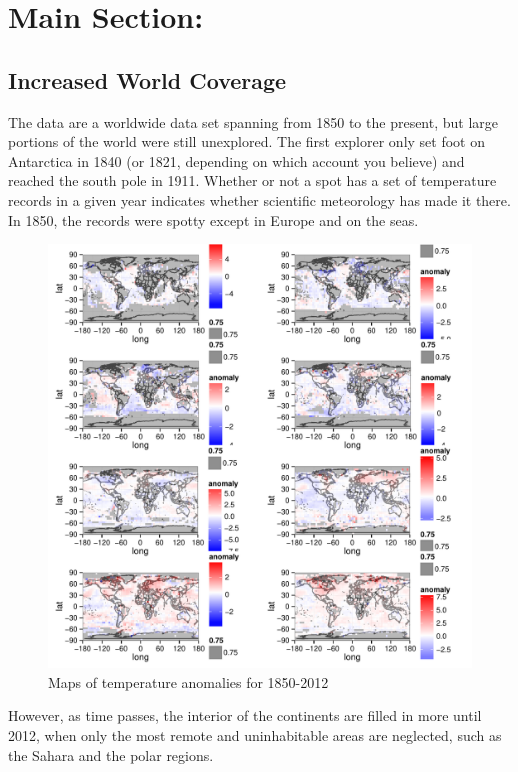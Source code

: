 \documentclass{article}\usepackage{graphicx, color}
\newenvironment{knitrout}{}{} %
\begin{document}
\section{Main Section:}
\subsection*{Increased World Coverage}
The data are a worldwide data set spanning from 1850 to the present, but large portions of the world were still unexplored. The first explorer only set foot on Antarctica in 1840 (or 1821, depending on which account you believe) and reached the south pole in 1911. Whether or not a spot has a set of temperature records in a given year indicates whether scientific meteorology has made it there. In 1850, the records were spotty except in Europe and on the seas.
\begin{figure}[H]
\begin{knitrout}
\color{fgcolor}\includegraphics[width=\linewidth]{figure/chunk2} 
\end{knitrout}

\caption{\label{multiyearmap}Maps of temperature anomalies for 1850-2012}
\end{figure}

However, as time passes, the interior of the continents are filled in more until 2012, when only the most remote and uninhabitable areas are neglected, such as the Sahara and the polar regions.
\end{document}
